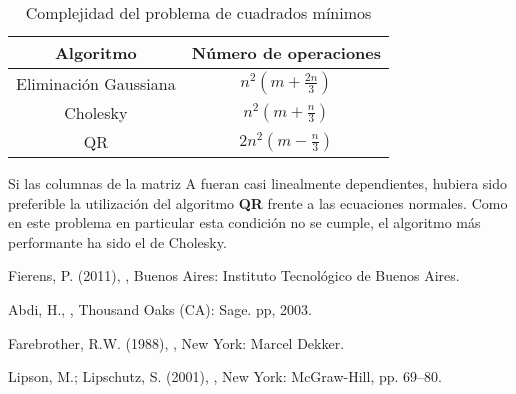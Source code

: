\documentclass[%
	final,
	reprint,
	notitlepage,
	narroweqnarray,
	inline,
	twoside,
	invited
	]{ieee}
\begin{document}
\begin{table}[H]
\begin{center}
\begin{tabular}{|c|c|}
\hline
Algoritmo & Número de operaciones\\
\hline
\hline

Eliminación Gaussiana & $n^2(m+\frac{2n}{3})$\\
Cholesky & $n^2(m+\frac{n}{3})$\\
QR & $2n^2(m-\frac{n}{3})$\\

\hline  
\end{tabular}
\end{center}
\caption{Complejidad del problema de cuadrados mínimos}
\label{tmedio}
\end{table}

Si las columnas de la matriz A fueran casi linealmente dependientes, hubiera sido preferible la utilización del algoritmo \textbf{QR} frente a las ecuaciones normales. Como en este problema en particular esta condición no se cumple, el algoritmo más performante ha sido el de Cholesky.


%
%
%
%
%

\clearpage

\begin{thebibliography}{1}

Fierens, P. (2011),
,
\newblock Buenos Aires: Instituto Tecnológico de Buenos Aires.

Abdi, H.,
,
\newblock Thousand Oaks (CA): Sage. pp, 2003.

Farebrother, R.W. (1988),
, \newblock New York: Marcel Dekker.

Lipson, M.; Lipschutz, S. (2001),
, 
\newblock New York: McGraw-Hill, pp. 69–80.


\end{thebibliography}
\end{document}
